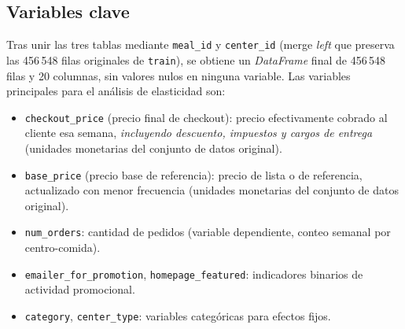 \documentclass[doc, a4paper, biblatex, floatsintext, longtable, babel]{apa7}
\begin{document}
\subsection{Variables clave}

Tras unir las tres tablas mediante \texttt{meal\_id} y \texttt{center\_id} (merge \textit{left} que preserva las 456\,548 filas originales de \texttt{train}), se obtiene un \textit{DataFrame} final de 456\,548 filas y 20 columnas, sin valores nulos en ninguna variable. Las variables principales para el an\'alisis de elasticidad son:

\begin{itemize}
    \item \texttt{checkout\_price} (precio final de checkout): precio efectivamente cobrado al cliente esa semana, \textit{incluyendo descuento, impuestos y cargos de entrega} (unidades monetarias del conjunto de datos original).
    \item \texttt{base\_price} (precio base de referencia): precio de lista o de referencia, actualizado con menor frecuencia (unidades monetarias del conjunto de datos original).
    \item \texttt{num\_orders}: cantidad de pedidos (variable dependiente, conteo semanal por centro-comida).
    \item \texttt{emailer\_for\_promotion}, \texttt{homepage\_featured}: indicadores binarios de actividad promocional.
    \item \texttt{category}, \texttt{center\_type}: variables categ\'oricas para efectos fijos.
\end{itemize}
\end{document}
